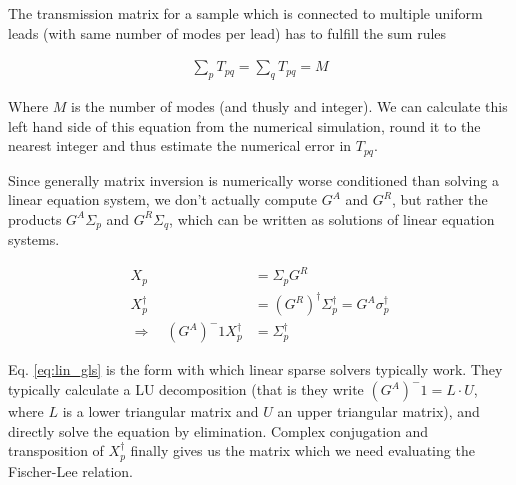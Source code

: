 The transmission matrix for a sample which is connected to multiple uniform
leads (with same number of modes per lead) has to fulfill the sum rules

\begin{align}
    \sum_p T_{pq} = \sum_q T_{pq} = M
\end{align}

Where $M$ is the number of modes (and thusly and integer). We can calculate
this left hand side of this equation from the numerical simulation, round it
to the nearest integer and thus estimate the numerical error in $T_{pq}$.

Since generally matrix inversion is numerically worse conditioned than solving
a linear equation system\cite{matrixinversion}, we don't actually compute
$G^A$ and $G^R$, but rather the products $G^A\Sigma_p$ and $G^R\Sigma_q$,
which can be written as solutions of linear equation systems.

\begin{align}
    X_p &= \Sigma_p G^R\\
    X_p^\dagger &= (G^R)^\dagger \Sigma_p^\dagger = G^A \sigma_p^\dagger\\
    \Rightarrow\quad (G^A)^-1 X_p^\dagger &= \Sigma_p^\dagger
    \label{eq:lin_gls}
\end{align}

Eq. \ref{eq:lin_gls} is the form with which linear sparse solvers typically
work. They typically calculate a LU decomposition (that is they write
$(G^A)^-1 = L \cdot U$, where $L$ is a lower triangular matrix and $U$ an
upper triangular matrix), and directly solve the equation by elimination.
Complex conjugation and transposition of $X_p^\dagger$ finally gives us the
matrix which we need evaluating the Fischer-Lee relation.

